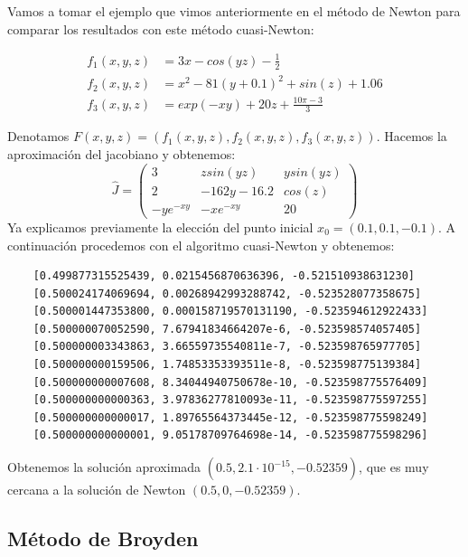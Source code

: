 \begin{example}
	
	Vamos a tomar el ejemplo que vimos anteriormente en el método de Newton para comparar los resultados con este método cuasi-Newton:
	
	\begin{align*}
		f_1(x,y,z) &= 3x - cos(yz) - \frac{1}{2} \\
		f_2(x,y,z) &= x^2 - 81(y+0.1)^2 + sin(z) + 1.06\\
		f_3(x,y,z) &= exp(-xy) + 20z + \frac{10\pi-3}{3}
	\end{align*}
	
	Denotamos $F(x,y,z) = (f_1(x,y,z),f_2(x,y,z),f_3(x,y,z))$.
	Hacemos la aproximación del jacobiano y obtenemos:
	$$
	\widehat{J} = 
	\begin{pmatrix}
		3 & z sin(yz) & y sin(yz) \\
		2 & -162y-16.2 & cos(z) \\
		-ye^{-xy} & -xe^{-xy} & 20
	\end{pmatrix}
	$$
	Ya explicamos previamente la elección del punto inicial $x_0 = (0.1,0.1,-0.1)$.
	A continuación procedemos con el algoritmo cuasi-Newton y obtenemos:
	\begin{verbatim}
	[0.499877315525439, 0.0215456870636396, -0.521510938631230]
	[0.500024174069694, 0.00268942993288742, -0.523528077358675]
	[0.500001447353800, 0.000158719570131190, -0.523594612922433]
	[0.500000070052590, 7.67941834664207e-6, -0.523598574057405]
	[0.500000003343863, 3.66559735540811e-7, -0.523598765977705]
	[0.500000000159506, 1.74853353393511e-8, -0.523598775139384]
	[0.500000000007608, 8.34044940750678e-10, -0.523598775576409]
	[0.500000000000363, 3.97836277810093e-11, -0.523598775597255]
	[0.500000000000017, 1.89765564373445e-12, -0.523598775598249]
	[0.500000000000001, 9.05178709764698e-14, -0.523598775598296]
	\end{verbatim}
	
	Obtenemos la solución aproximada $(0.5, 2.1 \cdot 10^{-15}, -0.52359)$, que es muy cercana a la solución de Newton $(0.5, 0, -0.52359)$.
	
\end{example}


\subsection{Método de Broyden}

